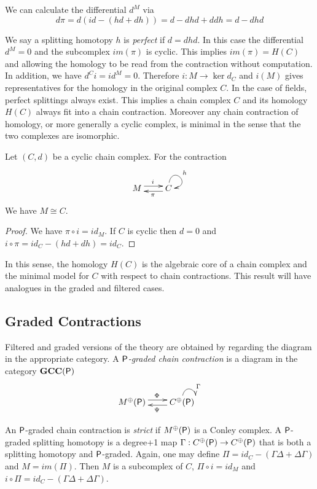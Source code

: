 We can calculate the differential $d^M$ via $$d\pi = d(id-(hd+dh)) = d-dhd + ddh = d-dhd$$


We say a splitting homotopy $h$ is {\em perfect} if $d=dhd$.  In this case the differential $d^M=0$ and the subcomplex $im(\pi)$ is cyclic.  This implies $im(\pi)=H(C)$ and allowing the homology to be read from the contraction without computation.  In addition, we have $d^Ci = id^M = 0$.  Therefore $i:M\to \ker d_C$ and $i(M)$ gives representatives for the homology in the original complex $C$. In the case of fields, perfect splittings always exist.  This implies a chain complex $C$ and its homology $H(C)$ always fit into a chain contraction. Moreover any chain contraction of homology, or more generally a cyclic complex, is minimal in the sense that the two complexes are isomorphic.

\begin{prop}
Let $(C,d)$ be a cyclic chain complex. For the contraction
\[
\xymatrixrowsep{0.03in}
\xymatrixcolsep{0.3in}
\xymatrix{
M  \ar[r]<3pt>^{i} & \ar[l]<3pt>^{\pi} C \ar@(u,r)^{h}
}
\]
We have $M\cong C$.
\end{prop}
\begin{proof}
We have $\pi \circ i  = id_M$.  If $C$ is cyclic then $d=0$ and $i\circ\pi = id_C-(hd+dh) = id_C$.
\end{proof}

In this sense, the homology $H(C)$ is the algebraic core of a chain complex and the minimal model for $C$ with respect to chain contractions.  This result will have analogues in the graded and filtered cases.


\subsection{Graded Contractions}

Filtered and graded versions of the theory are obtained by regarding the diagram in the appropriate category.  A {\em ${\mathsf P}$-graded chain contraction} is a diagram in the category ${\bf GCC({\mathsf P})}$
 \[
\xymatrixrowsep{0.03in}
\xymatrixcolsep{0.3in}
\xymatrix{
M^\oplus(\sP)  \ar[r]<3pt>^{\Phi} & \ar[l]<3pt>^{\Psi} C^\oplus(\sP) \ar@(u,r)^{\Gamma}
}
\]

 An ${\mathsf P}$-graded chain contraction is {\em strict} if $M^\oplus({\mathsf P})$ is a Conley complex.  A ${\mathsf P}$-graded splitting homotopy is a degree+1 map $\Gamma:C^\oplus({\mathsf P})\to C^\oplus({\mathsf P})$ that is both a splitting homotopy and ${\mathsf P}$-graded.    Again, one may define $\Pi=id_C-(\Gamma\Delta+\Delta\Gamma)$ and $M=im(\Pi)$.  Then $M$ is a subcomplex of $C$, $\Pi \circ i = id_M$ and $i\circ \Pi = id_C-(\Gamma\Delta+\Delta\Gamma)$.  
  
